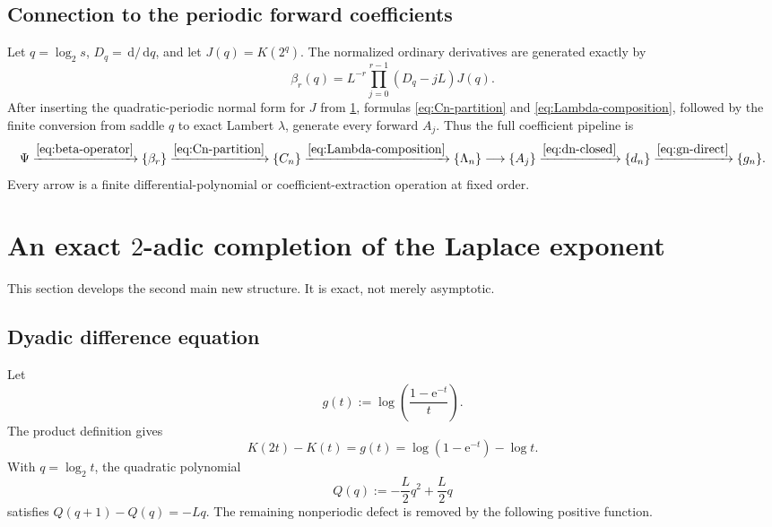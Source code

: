 \documentclass[11pt,oneside]{article}
\numberwithin{equation}{section}
\theoremstyle{definition}
\theoremstyle{remark}
\newcommand{\e}{\mathrm e}
\newcommand{\dd}{\,\mathrm d}
\begin{document}
\subsection{Connection to the periodic forward coefficients}

Let $q=\log_2s$, $D_q=\dd/\dd q$, and let $J(q)=K(2^q)$.  The normalized
ordinary derivatives are generated exactly by
\begin{equation}
 \beta_r(q)=L^{-r}\prod_{j=0}^{r-1}(D_q-jL)J(q).
 \label{eq:beta-operator}
\end{equation}
After inserting the quadratic-periodic normal form for $J$ from
\cref{sec:dyadic-tail}, formulas \eqref{eq:Cn-partition} and
\eqref{eq:Lambda-composition}, followed by the finite conversion from saddle
$q$ to exact Lambert $\lambda$, generate every forward $A_j$.  Thus the full
coefficient pipeline is
\begin{equation}
 \Psi
 \xrightarrow{\eqref{eq:beta-operator}}
 \{\beta_r\}
 \xrightarrow{\eqref{eq:Cn-partition}}
 \{C_n\}
 \xrightarrow{\eqref{eq:Lambda-composition}}
 \{\Lambda_n\}
 \longrightarrow
 \{A_j\}
 \xrightarrow{\eqref{eq:dn-closed}}
 \{d_n\}
 \xrightarrow{\eqref{eq:gn-direct}}
 \{g_n\}.
 \label{eq:pipeline}
\end{equation}
Every arrow is a finite differential-polynomial or coefficient-extraction
operation at fixed order.

\section{An exact \texorpdfstring{$2$}{2}-adic completion of the Laplace exponent}
\label{sec:dyadic-tail}

This section develops the second main new structure.  It is exact, not merely
asymptotic.

\subsection{Dyadic difference equation}

Let
\begin{equation}
 g(t):=\log\!\left(\frac{1-\e^{-t}}t\right).
 \label{eq:g-laplace}
\end{equation}
The product definition gives
\begin{equation}
 K(2t)-K(t)=g(t)=\log(1-\e^{-t})-\log t.
 \label{eq:K-difference}
\end{equation}
With $q=\log_2t$, the quadratic polynomial
\begin{equation}
 Q(q):=-\frac L2q^2+\frac L2q
 \label{eq:Qq}
\end{equation}
satisfies $Q(q+1)-Q(q)=-Lq$.  The remaining nonperiodic defect is removed by
the following positive function.
\end{document}
